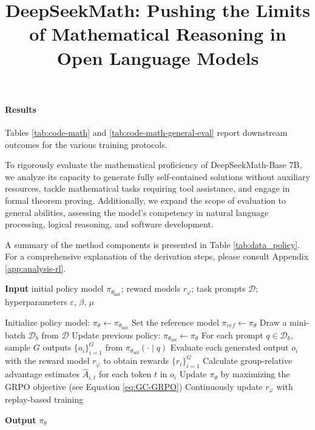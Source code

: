 \title{DeepSeekMath: Pushing the Limits of Mathematical Reasoning in Open Language Models}
\paragraph{Results}
Tables \ref{tab:code-math} and \ref{tab:code-math-general-eval} report downstream outcomes for the various training protocols.

To rigorously evaluate the mathematical proficiency of DeepSeekMath-Base 7B, we analyze its capacity to generate fully self-contained solutions without auxiliary resources, tackle mathematical tasks requiring tool assistance, and engage in formal theorem proving. Additionally, we expand the scope of evaluation to general abilities, assessing the model’s competency in natural language processing, logical reasoning, and software development.

A summary of the method components is presented in Table \ref{tab:data_policy}. For a comprehensive explanation of the derivation steps, please consult Appendix \ref{app:analysis-rl}.

\begin{algorithm}[t]
  \small
  \caption{Iterative Group Relative Policy Optimization}
  \textbf{Input} initial policy model $\pi_{\theta_{\text{init}}}$; reward models $r_\varphi$; task prompts $\mathcal{D}$; 
  hyperparameters $\varepsilon$, $\beta$, $\mu$
  \begin{algorithmic}[1]
    \State Initialize policy model: $\pi_\theta \leftarrow \pi_{\theta_{\text{init}}}$
       \State Set the reference model $\pi_{ref} \leftarrow \pi_{\theta}$
      \State Draw a mini-batch $\mathcal{D}_b$ from $\mathcal{D}$
      \State Update previous policy: $\pi_{\theta_{old}} \leftarrow \pi_{\theta}$ 
      \State For each prompt $q \in \mathcal{D}_b$, sample $G$ outputs $\{o_i\}_{i=1}^G$ from $\pi_{\theta_{old}} (\cdot \mid q)$
      \State Evaluate each generated output $o_i$ with the reward model $r_{\varphi}$ to obtain rewards $\{r_i\}_{i=1}^G$
      \State Calculate group-relative advantage estimates $\hat{A}_{i,t}$ for each token $t$ in $o_i$
        \State Update $\pi_{\theta}$ by maximizing the GRPO objective (see Equation \ref{eq:GC-GRPO})
      \EndFor
    \EndFor
    \State Continuously update $r_\varphi$ with replay-based training
    \EndFor 
  \end{algorithmic}
  \textbf{Output} $\pi_\theta$
  \label{alg:iter-grpo}
\end{algorithm}

